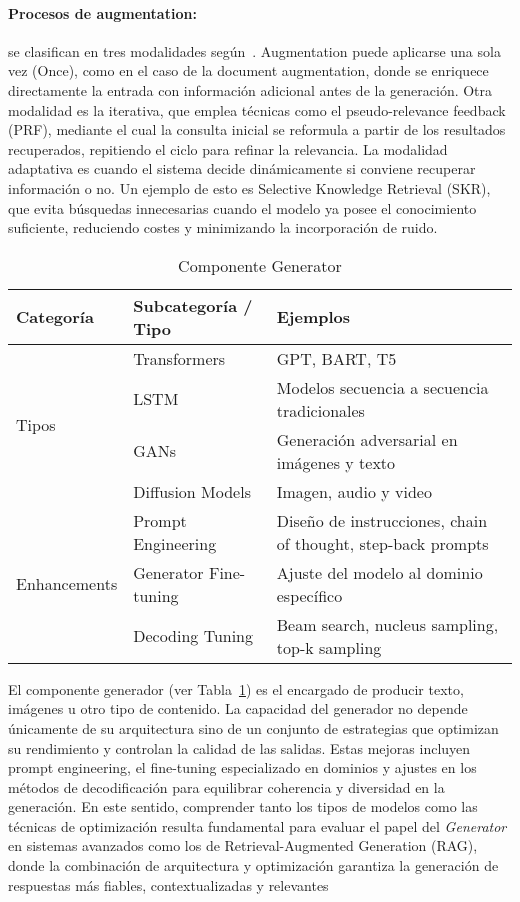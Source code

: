 \paragraph{Procesos de augmentation:} se clasifican en tres modalidades según~\textcite{zhao2024rag}. 
Augmentation puede aplicarse una sola vez (Once), como en el caso de la document augmentation, 
donde se enriquece directamente la entrada con información adicional antes de la generación. 
Otra modalidad es la iterativa, que emplea técnicas como el pseudo-relevance feedback (PRF), 
mediante el cual la consulta inicial se reformula a partir de los resultados recuperados, repitiendo el ciclo 
para refinar la relevancia. 
La modalidad adaptativa es cuando el sistema decide dinámicamente si conviene recuperar 
información o no. Un ejemplo de esto es Selective Knowledge Retrieval (SKR), que evita búsquedas 
innecesarias cuando el modelo ya posee el conocimiento suficiente, reduciendo costes y minimizando la 
incorporación de ruido.


\begin{table}[htbp]
\centering
\begin{tabularx}{\textwidth}{l l X}
\toprule
\textbf{Categoría} & \textbf{Subcategoría / Tipo} & \textbf{Ejemplos} \\ \midrule
\multirow{4}{*}{Tipos} 
  & Transformers      & GPT, BART, T5 \\
  & LSTM             & Modelos secuencia a secuencia tradicionales \\
  & GANs            & Generación adversarial en imágenes y texto \\
  & Diffusion Models  & Imagen, audio y video \\ \midrule
\multirow{3}{*}{Enhancements}
  & Prompt Engineering   & Diseño de instrucciones, chain of thought, step-back prompts \\
  & Generator Fine-tuning& Ajuste del modelo al dominio específico \\
  & Decoding Tuning      & Beam search, nucleus sampling, top-k sampling \\ \bottomrule
\end{tabularx}
\caption{Componente Generator}
\label{tab:generator}
\end{table}

El componente generador (ver Tabla~\ref{tab:generator}) es el encargado de producir texto, imágenes u otro tipo de contenido. La capacidad del generador no depende únicamente de su arquitectura sino de un conjunto 
de estrategias que optimizan su rendimiento y controlan la calidad de las salidas. Estas mejoras incluyen prompt engineering, el fine-tuning especializado en dominios y 
ajustes en los métodos de decodificación para equilibrar coherencia y diversidad en la generación. En este sentido, comprender tanto los tipos de modelos como las técnicas de optimización resulta fundamental para evaluar el papel del \textit{Generator} 
en sistemas avanzados como los de Retrieval-Augmented Generation (RAG), donde la combinación de arquitectura y optimización garantiza la generación de respuestas 
más fiables, contextualizadas y relevantes 
\parencite{casola2022pretrained,fan2024ragllm,zhang2025hallucination}

